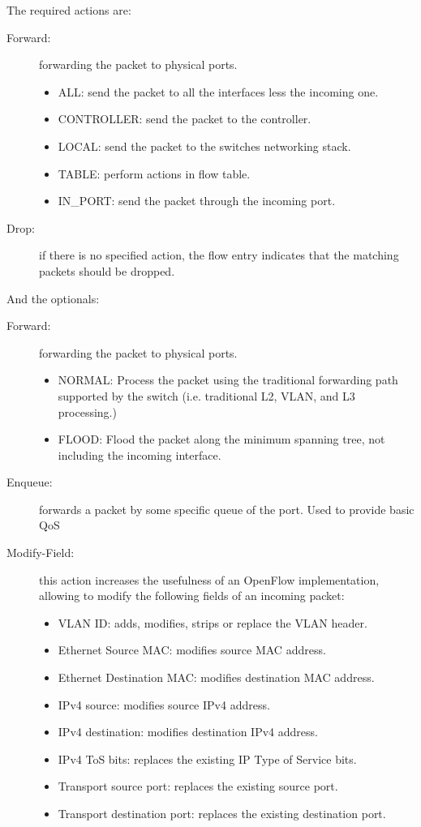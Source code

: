 The required actions are:




\begin{description}
\item[Forward:] forwarding the packet to physical ports.
	\begin{itemize}
	\item ALL: send the packet to all the interfaces less the incoming one.
	\item CONTROLLER: send the packet to the controller.
	\item LOCAL:  send the packet to the switches networking stack.
	\item TABLE: perform actions in flow table.
	\item IN\_PORT: send the packet through the incoming port.
	\end{itemize}
\item[Drop:] if there is no specified action, the flow entry indicates that the matching packets should be dropped.
\end{description}

And the optionals:

\begin{description}
\item[Forward:] forwarding the packet to physical ports.
	\begin{itemize}
	\item NORMAL: Process the packet using the traditional forwarding path supported by the switch (i.e. traditional L2, VLAN, and L3 processing.)
	\item FLOOD: Flood the packet along the minimum spanning tree, not including the incoming interface.
	\end{itemize}
 \item[Enqueue:] forwards a packet by some specific queue of the port. Used to provide basic QoS
 \item[Modify-Field:] this action increases the usefulness of an OpenFlow implementation, allowing to modify the following fields of an incoming packet:
	\begin{itemize}
	\item VLAN ID: adds, modifies, strips or replace the VLAN header. 
	\item Ethernet Source MAC: modifies source MAC address.
	\item Ethernet Destination MAC: modifies destination MAC address.
	\item IPv4 source: modifies source IPv4 address.
	\item IPv4 destination: modifies destination IPv4 address.
	\item IPv4 ToS bits: replaces the existing IP Type of Service bits.
	\item Transport source port: replaces the existing source port.
	\item Transport destination port: replaces the existing destination port.
	\end{itemize}
\end{description}


